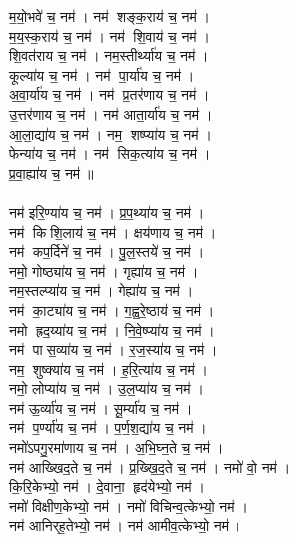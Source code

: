 म॒यो॒भवे॑ च॒ नम॑। नम॑ शङ्क॒राय॑ च॒ नम॑। \\
म॒य॒स्क॒राय॑ च॒ नम॑। नम॑ शि॒वाय॑  च॒ नम॑। \\
शि॒वत॑राय च॒ नम॑। नम॒स्तीर्थ्या॑य च॒ नम॑। \\
कूल्या॑य च॒ नम॑। नम॑ पा॒र्या॑य च॒ नम॑। \\
अ॒वा॒र्या॑य च॒ नम॑। नम॑ प्र॒तर॑णाय च॒ नम॑। \\
उ॒त्तर॑णाय च॒ नम॑। नम॑ आता॒र्या॑य च॒ नम॑। \\
आ॒ला॒द्या॑य च॒ नम॑। नम॒ शष्प्या॑य च॒ नम॑। \\
फेन्या॑य च॒ नम॑। नम॑ सिक॒त्या॑य च॒ नम॑। \\
प्र॒वा॒ह्या॑य च॒ नम॑॥ \\
\\
नम॑ इरि॒ण्या॑य च॒ नम॑। प्र॒प॒थ्या॑य च॒ नम॑। \\
नम॑ किशि॒लाय॑ च॒ नम॑। क्षय॑णाय च॒ नम॑। \\
नम॑ कप॒र्दिने॑ च॒ नम॑। पु॒ल॒स्तये॑ च॒ नम॑।\\
नमो॒ गोष्ठ्या॑य च॒ नम॑। गृह्या॑य च॒ नम॑। \\
नम॒स्तल्प्या॑य च॒ नम॑। गेह्या॑य च॒ नम॑। \\
नम॑ का॒ट्या॑य च॒ नम॑। ग॒ह्व॒रे॒ष्ठाय॑ च॒ नम॑।\\
नमो ह्रद॒य्या॑य च॒ नम॑। नि॒वे॒ष्प्या॑य च॒ नम॑। \\
नम॑ पास॒व्या॑य च॒ नम॑। र॒ज॒स्या॑य च॒ नम॑।\\
नम॒ शुष्क्या॑य च॒ नम॑। ह॒रि॒त्या॑य च॒ नम॑। \\
नमो॒ लोप्या॑य च॒ नम॑। उ॒ल॒प्या॑य च॒ नम॑। \\
नम॑ ऊ॒र्व्या॑य च॒ नम॑। सू॒र्म्या॑य च॒ नम॑। \\
नम॑ प॒र्ण्या॑य च॒ नम॑। प॒र्ण॒श॒द्या॑य च॒ नम॑। \\
नमो॑ऽपगु॒रमा॑णाय च॒ नम॑। अ॒भि॒घ्न॒ते च॒ नम॑। \\
नम॑ आख्खिद॒ते च॒ नम॑। प्र॒ख्खि॒द॒ते च॒ नम॑। नमो॑ वो॒ नम॑। \\
कि॒रि॒केभ्यो॒ नम॑। दे॒वाना॒ हृद॑येभ्यो॒ नम॑। \\
नमो॑ विक्षीण॒केभ्यो॒ नम॑। नमो॑ विचिन्व॒त्केभ्यो॒ नम॑। \\
नम॑ आनिर्‌ह॒तेभ्यो॒ नम॑। नम॑ आमीव॒त्केभ्यो॒ नम॑। \\
{\small \closesection}


